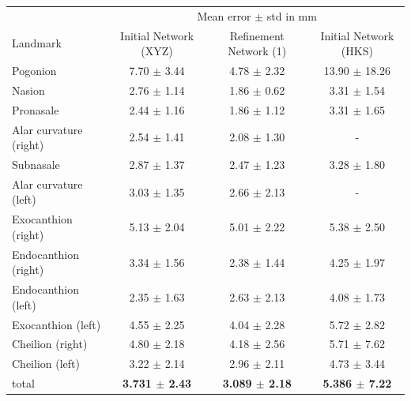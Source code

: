 \documentclass[class=article, crop=false]{standalone}
\begin{document}
\begin{table}[!htbp]
\label{table:ref_hks}
\begin{tabularx}{\textwidth}{l|c|c|c}
\toprule
 & \multicolumn{3}{c}{Mean error $\pm$ std in mm} \\\cmidrule(lr){2-4}
Landmark               & \hspace{0.3cm}Initial Network (XYZ) \hspace{0.3cm}  & \hspace{0.3cm} Refinement Network (1) \hspace{0.3cm} & \hspace{0.3cm} Initial Network (HKS) \hspace{0.3cm}     
\\
\midrule
Pogonion               & 7.70 $\pm$ 3.44 & 4.78 $\pm$ 2.32 & 13.90 $\pm$ 18.26\\
Nasion                 & 2.76 $\pm$ 1.14 & 1.86 $\pm$ 0.62 & 3.31 $\pm$ 1.54\\
Pronasale              & 2.44 $\pm$ 1.16 & 1.86 $\pm$ 1.12 & 3.31 $\pm$ 1.65\\
Alar curvature (right) & 2.54 $\pm$ 1.41 & 2.08 $\pm$ 1.30 & -\\
Subnasale              & 2.87 $\pm$ 1.37 & 2.47 $\pm$ 1.23 & 3.28 $\pm$ 1.80\\
Alar curvature (left)  & 3.03 $\pm$ 1.35 & 2.66 $\pm$ 2.13 & - \\
Exocanthion (right)    & 5.13 $\pm$ 2.04 & 5.01 $\pm$ 2.22 & 5.38 $\pm$ 2.50\\
Endocanthion (right)   & 3.34 $\pm$ 1.56 & 2.38 $\pm$ 1.44 & 4.25 $\pm$ 1.97\\
Endocanthion (left)    & 2.35 $\pm$ 1.63 & 2.63 $\pm$ 2.13 & 4.08 $\pm$ 1.73\\
Exocanthion (left)     & 4.55 $\pm$ 2.25 & 4.04 $\pm$ 2.28 & 5.72 $\pm$ 2.82\\
Cheilion (right)       & 4.80 $\pm$ 2.18 & 4.18 $\pm$ 2.56 & 5.71 $\pm$ 7.62\\
Cheilion (left)        & 3.22 $\pm$ 2.14 & 2.96 $\pm$ 2.11 & 4.73 $\pm$ 3.44\\
\bottomrule
total & \textbf{3.731 $\pm$ 2.43} & \textbf{3.089 $\pm$ 2.18} & \textbf{5.386 $\pm$ 7.22}
\end{tabularx}
\end{table}
\end{document}
